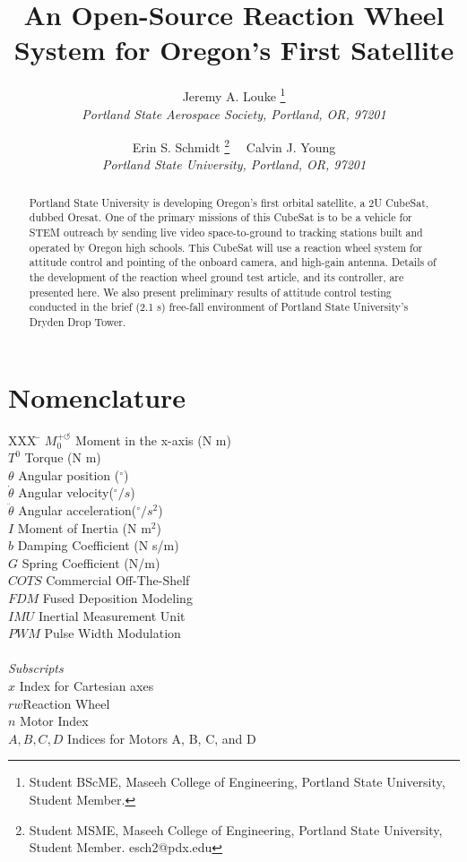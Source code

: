 \documentclass[]{aiaa-tc}%
\title{An Open-Source Reaction Wheel System for Oregon's First Satellite}
\author{
  Jeremy A. Louke%
  	\thanks{Student BScME, Maseeh College of Engineering, Portland State University, Student Member.}\\
  {\normalsize\itshape
   Portland State Aerospace Society, Portland, OR, 97201}\\
  \and
  Erin S. Schmidt%
  	\thanks{Student MSME, Maseeh College of Engineering, Portland State University, Student Member. esch2@pdx.edu} \ \
  Calvin J. Young\thanksibid{1}\\
  {\normalsize\itshape
  Portland State University, Portland, OR, 97201}
 }
\begin{document}
\maketitle

\begin{abstract}
Portland State University is developing Oregon's first orbital satellite, a 2U CubeSat, dubbed Oresat. One of the primary missions of this CubeSat is to be a vehicle for STEM outreach by sending live video space-to-ground to tracking stations built and operated by Oregon high schools. This CubeSat will use a reaction wheel system for attitude control and pointing of the onboard camera, and high-gain antenna. Details of the development of the reaction wheel ground test article, and its controller, are presented here. We also present preliminary results of attitude control testing conducted in the brief (2.1 s) free-fall environment of Portland State University's Dryden Drop Tower. 
\end{abstract}

\section*{Nomenclature}

\begin{center}
\parbox{0cm}
{\begin{tabbing}
  XXX \= \kill%
  $M_0^{+ \circlearrowleft}$ \qquad Moment in the x-axis (N m)\\
  $T^0$ \qquad Torque (N m)\\
  $\theta$ \qquad Angular position (${}^{\circ}$)\\
  $\dot{\theta}$ \qquad Angular velocity(${}^{\circ}/s$)\\ 
  $\ddot{\theta}$ \qquad Angular acceleration(${}^{\circ}/s^2$) \\
  $I$ \qquad Moment of Inertia (N $\textrm{m}^2$)\\
  $b$ \qquad Damping Coefficient (N s/m)\\ 
  $G$ \qquad Spring Coefficient (N/m)\\
  $COTS$ \qquad Commercial Off-The-Shelf\\
  $FDM$ \qquad Fused Deposition Modeling\\
  $IMU$ \qquad Inertial Measurement Unit\\
  $PWM$ \qquad Pulse Width Modulation\\ \\
  \textit{Subscripts}\\
  $x$ \qquad Index for Cartesian axes \\
  $rw$\qquad Reaction Wheel\\
  $n$ \qquad Motor Index\\
  $A, B, C, D$ \qquad Indices for Motors A, B, C, and D\\
 \end{tabbing}}
 \end{center}
 
\end{document}
